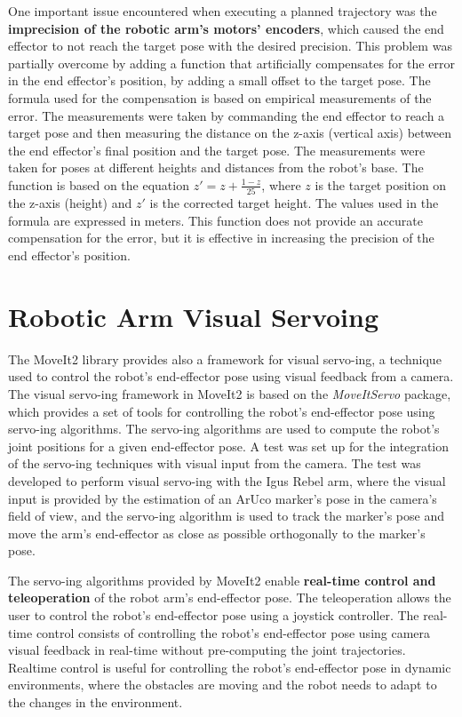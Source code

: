 One important issue encountered when executing a planned trajectory was the
\textbf{imprecision of the robotic arm's motors' encoders}, which caused the end effector
to not reach the target pose with the desired precision. This problem was partially overcome by adding a function
that artificially compensates for the error in the end effector's position, by adding a small offset 
to the target pose. The formula used for the compensation is based on empirical measurements of the error.
The measurements were taken by commanding the end effector to reach a target pose and then measuring the distance
on the z-axis (vertical axis) between the end effector's final position and the target pose.
The measurements were taken for poses at different heights and distances from the robot's base.
The function is based on the equation 
$z' = z + \frac{1 - z}{25}$, where $z$ is the target position on the z-axis (height) and $z'$ is the corrected target height.
The values used in the formula are expressed in meters.
This function does not provide an accurate compensation for the error, but it is effective in increasing the precision
of the end effector's position.


\section{Robotic Arm Visual Servoing}

The MoveIt2 library provides also a framework for visual servo-ing, a technique used to control the robot's
end-effector pose using visual feedback from a camera. The visual servo-ing framework in MoveIt2 is based on the
\textit{MoveItServo} package, which provides a set of tools for controlling the robot's end-effector pose using
servo-ing algorithms. The servo-ing algorithms are used to compute the robot's joint positions for a given end-effector
pose. A test was set up for the integration of the servo-ing techniques with visual input from the camera.
The test was developed to perform visual servo-ing with the Igus Rebel arm, where the visual input
is provided by the estimation of an ArUco marker's pose in the camera's field of view, and the servo-ing algorithm
is used to track the marker's pose and move the arm's end-effector as close as possible orthogonally to the marker's pose.

The servo-ing algorithms provided by MoveIt2 enable \textbf{real-time control and teleoperation} of the robot arm's
end-effector pose. The teleoperation allows the user to control the robot's end-effector pose using a joystick controller.
The real-time control consists of controlling the robot's end-effector pose using camera visual feedback
in real-time without pre-computing the joint trajectories. Realtime control is useful for controlling the robot's
end-effector pose in dynamic environments, where the obstacles are moving and the robot needs to adapt to the changes
in the environment.

